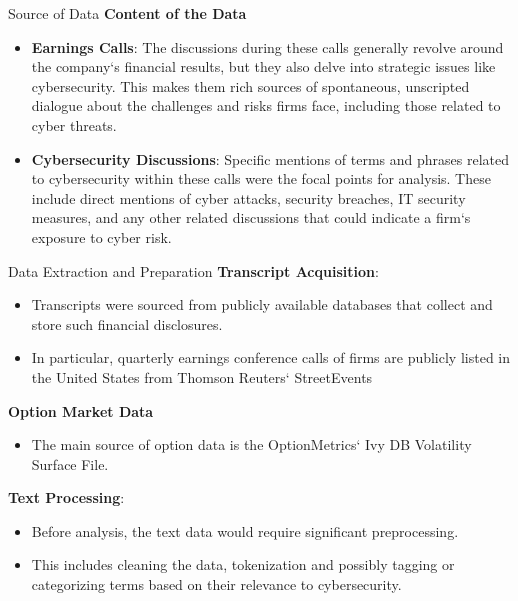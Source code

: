\documentclass[11pt]{beamer}
\newcommand{\hly}[1]{\colorbox{yellow!100}{#1}}
\begin{document}
\begin{frame}{Source of Data}
\textbf{Content of the Data}

	\begin{itemize}
		\item \textbf{Earnings Calls}: The discussions during these calls generally revolve around the company`s financial results, but they also delve into strategic issues like cybersecurity. This makes them rich sources of spontaneous, unscripted dialogue about the challenges and risks firms face, including those related to cyber threats.

		\item \textbf{Cybersecurity Discussions}: Specific mentions of terms and phrases related to cybersecurity within these calls were the focal points for analysis. These include direct mentions of cyber attacks, security breaches, IT security measures, and any other related discussions that could indicate a firm`s exposure to cyber risk.

	\end{itemize}
\end{frame}
\begin{frame}{Data Extraction and Preparation}
\textbf{Transcript Acquisition}: 

	\begin{itemize}
		\item Transcripts were sourced from publicly available databases that collect and store such financial disclosures. 

		\item In particular, quarterly earnings conference calls of firms are publicly listed in the United States from Thomson Reuters` StreetEvents

	\end{itemize}
\textbf{Option Market Data}

	\begin{itemize}
		\item The main source of option data is the \hly{OptionMetrics` Ivy DB} Volatility Surface File.

	\end{itemize}
\textbf{Text Processing}: 

	\begin{itemize}
		\item Before analysis, the text data would require significant preprocessing. 

		\item This includes cleaning the data, tokenization and possibly tagging or categorizing terms based on their relevance to cybersecurity.

	\end{itemize}
\end{frame}
\end{document}
